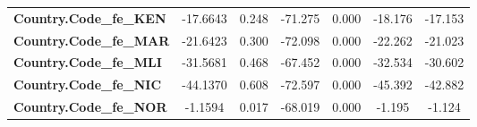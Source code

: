 \begin{center}
\begin{tabular}{lcccccc}
\textbf{Country.Code\_fe\_KEN}                                     &     -17.6643  &        0.248     &   -71.275  &         0.000        &      -18.176    &      -17.153     \\
\textbf{Country.Code\_fe\_MAR}                                     &     -21.6423  &        0.300     &   -72.098  &         0.000        &      -22.262    &      -21.023     \\
\textbf{Country.Code\_fe\_MLI}                                     &     -31.5681  &        0.468     &   -67.452  &         0.000        &      -32.534    &      -30.602     \\
\textbf{Country.Code\_fe\_NIC}                                     &     -44.1370  &        0.608     &   -72.597  &         0.000        &      -45.392    &      -42.882     \\
\textbf{Country.Code\_fe\_NOR}                                     &      -1.1594  &        0.017     &   -68.019  &         0.000        &       -1.195    &       -1.124     \\
\bottomrule
\end{tabular}
\end{center}